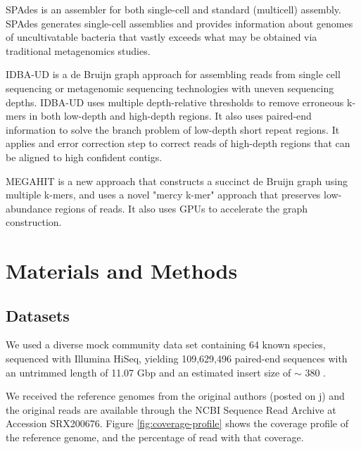 SPAdes \cite{spades} is an assembler for both single-cell and standard (multicell) assembly. SPAdes generates single-cell assemblies and provides information about genomes of uncultivatable bacteria that vastly exceeds what may be obtained via traditional metagenomics studies. 

IDBA-UD \cite{idba} is a de Bruijn graph approach for assembling reads from single cell sequencing or metagenomic sequencing technologies with uneven sequencing depths. IDBA-UD uses multiple depth-relative thresholds to remove erroneous k-mers in both low-depth and high-depth regions. It also uses paired-end information  to solve the branch problem of low-depth short repeat regions. It applies and error correction step to correct reads of high-depth regions that can be aligned to high confident contigs.

MEGAHIT \cite{megahit} is a new approach that constructs a succinct de Bruijn graph using multiple k-mers, and uses a novel "mercy k-mer" approach that preserves low-abundance regions of reads. It also uses GPUs to accelerate the graph construction.
 

\section*{Materials and Methods}

\subsection*{Datasets}

We used a diverse mock community data set containing 64 known species,
sequenced with Illumina HiSeq, yielding 109,629,496 paired-end sequences with
an untrimmed length of 11.07 Gbp and an estimated insert size of $\sim$ 380
\cite{podar}.

We received the reference genomes from the original authors
(posted on j) and the original reads are available through
the NCBI Sequence Read Archive at Accession SRX200676. Figure \ref{fig:coverage-profile} shows the coverage profile of the reference genome, and the percentage of read with that coverage.  

